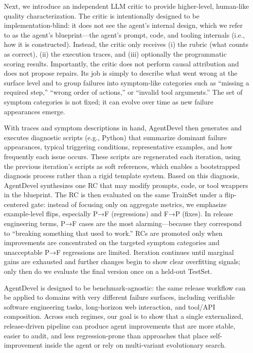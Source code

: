 \documentclass[11pt]{article}
\begin{document}
Next, we introduce an independent LLM critic to provide higher-level, human-like quality characterization. The critic is intentionally designed to be implementation-blind: it does not see the agent’s internal design, which we refer to as the agent’s blueprint—the agent’s prompt, code, and tooling internals (i.e., how it is constructed). Instead, the critic only receives (i) the rubric (what counts as correct), (ii) the execution traces, and (iii) optionally the programmatic scoring results. Importantly, the critic does not perform causal attribution and does not propose repairs. Its job is simply to describe what went wrong at the surface level and to group failures into symptom-like categories such as “missing a required step,” “wrong order of actions,” or “invalid tool arguments.” The set of symptom categories is not fixed; it can evolve over time as new failure appearances emerge.

With traces and symptom descriptions in hand, AgentDevel then generates and executes diagnostic scripts (e.g., Python) that summarize dominant failure appearances, typical triggering conditions, representative examples, and how frequently each issue occurs. These scripts are regenerated each iteration, using the previous iteration’s scripts as soft references, which enables a bootstrapped diagnosis process rather than a rigid template system. Based on this diagnosis, AgentDevel synthesizes one RC that may modify prompts, code, or tool wrappers in the blueprint. The RC is then evaluated on the same TrainSet under a flip-centered gate: instead of focusing only on aggregate metrics, we emphasize example-level flips, especially P→F (regressions) and F→P (fixes). In release engineering terms, P→F cases are the most alarming—because they correspond to “breaking something that used to work.” RCs are promoted only when improvements are concentrated on the targeted symptom categories and unacceptable P→F regressions are limited. Iteration continues until marginal gains are exhausted and further changes begin to show clear overfitting signals; only then do we evaluate the final version once on a held-out TestSet.

AgentDevel is designed to be benchmark-agnostic: the same release workflow can be applied to domains with very different failure surfaces, including verifiable software engineering tasks, long-horizon web interaction, and tool/API composition. Across such regimes, our goal is to show that a single externalized, release-driven pipeline can produce agent improvements that are more stable, easier to audit, and less regression-prone than approaches that place self-improvement inside the agent or rely on multi-variant evolutionary search.
\end{document}
